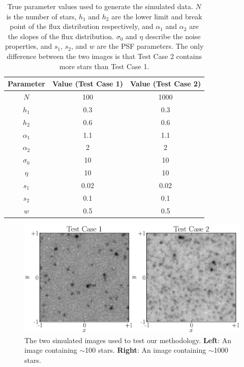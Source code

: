 \documentclass[12pt, preprint]{aastex}
\begin{document}
\begin{table}[ht!]\footnotesize
\begin{center}
\begin{tabular}{|c|c|c|}
\hline
Parameter & Value (Test Case 1) & Value (Test Case 2)\\
\hline
$N$ & 100 & 1000\\
$h_1$ & 0.3 & 0.3\\
$h_2$ & 0.6 & 0.6\\
$\alpha_1$ & 1.1 & 1.1\\
$\alpha_2$ & 2 & 2\\
\hline
$\sigma_0$ & 10 & 10\\
$\eta$ & 10 & 10 \\
$s_1$ & 0.02 & 0.02\\
$s_2$ & 0.1 & 0.1\\
$w$ & 0.5 & 0.5\\
\hline
\end{tabular}
\end{center}
\caption{True parameter values used to generate the simulated data. 
$N$ is the number of stars, $h_1$ and $h_2$ are the lower limit and break
point of the flux distribution respectively, and $\alpha_1$ and $\alpha_2$ 
are the slopes of the flux distribution. $\sigma_0$ and $\eta$ describe the
noise properties, and $s_1$, $s_2$, and $w$ are the PSF parameters. The only
difference between the two images is that Test Case 2 contains more stars than
Test Case 1.
\label{tab:truth}}
\end{table}

\begin{figure}[ht!]
\begin{center}
\includegraphics[width=\textwidth]{Figures/test_cases.eps}
\caption{The two simulated images used to test our methodology.
{\bf Left}: An image containing $\sim$100 stars.
{\bf Right}: An image containing $\sim$1000 stars.\label{fig:simulated_data}}
\end{center}
\end{figure}
\end{document}
